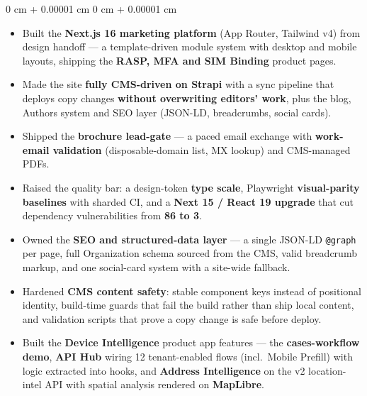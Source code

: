 \documentclass[10pt, letterpaper]{article}
\newenvironment{highlights}{
    \begin{itemize}[
        topsep=0.10 cm,
        parsep=0.10 cm,
        partopsep=0pt,
        itemsep=0pt,
        leftmargin=0 cm + 10pt
    ]
}{
    \end{itemize}
} %
\newenvironment{onecolentry}{
    \begin{adjustwidth}{
        0 cm + 0.00001 cm
    }{
        0 cm + 0.00001 cm
    }
}{
    \end{adjustwidth}
} %
\begin{document}
        \vspace{0.10 cm}
        \begin{onecolentry}
            \begin{highlights}
    \item Built the \textbf{Next.js 16 marketing platform} (App Router, Tailwind v4) from design handoff — a template-driven module system with desktop and mobile layouts, shipping the \textbf{RASP, MFA and SIM Binding} product pages.

    \item Made the site \textbf{fully CMS-driven on Strapi} with a sync pipeline that deploys copy changes \textbf{without overwriting editors' work}, plus the blog, Authors system and SEO layer (JSON-LD, breadcrumbs, social cards).

    \item Shipped the \textbf{brochure lead-gate} — a paced email exchange with \textbf{work-email validation} (disposable-domain list, MX lookup) and CMS-managed PDFs.

    \item Raised the quality bar: a design-token \textbf{type scale}, Playwright \textbf{visual-parity baselines} with sharded CI, and a \textbf{Next 15 / React 19 upgrade} that cut dependency vulnerabilities from \textbf{86 to 3}.

    \item Owned the \textbf{SEO and structured-data layer} — a single JSON-LD \texttt{@graph} per page, full Organization schema sourced from the CMS, valid breadcrumb markup, and one social-card system with a site-wide fallback.

    \item Hardened \textbf{CMS content safety}: stable component keys instead of positional identity, build-time guards that fail the build rather than ship local content, and validation scripts that prove a copy change is safe before deploy.

    \item Built the \textbf{Device Intelligence} product app features — the \textbf{cases-workflow demo}, \textbf{API Hub} wiring 12 tenant-enabled flows (incl.\ Mobile Prefill) with logic extracted into hooks, and \textbf{Address Intelligence} on the v2 location-intel API with spatial analysis rendered on \textbf{MapLibre}.

            \end{highlights}
        \end{onecolentry}
\end{document}
